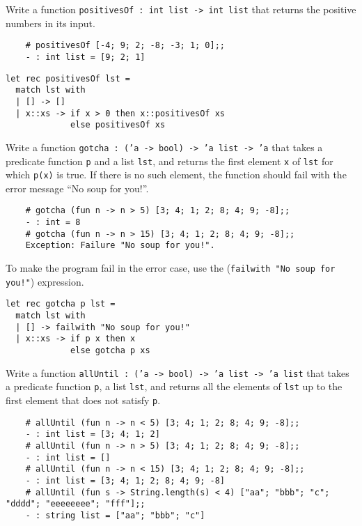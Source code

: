 \documentclass[addpoints]{exam}
\begin{document}
\begin{questions}
  \question 
  Write a function \texttt{positivesOf : int list -> int list}
  that returns the positive numbers in its input.
  \begin{verbatim}
    # positivesOf [-4; 9; 2; -8; -3; 1; 0];;
    - : int list = [9; 2; 1]
  \end{verbatim}
  
  \begin{solutionbox}{3.5cm}
    \begin{verbatim}
let rec positivesOf lst =
  match lst with
  | [] -> []
  | x::xs -> if x > 0 then x::positivesOf xs
             else positivesOf xs
    \end{verbatim}
  \end{solutionbox}

  
  \question 
  Write a function \texttt{gotcha : ('a -> bool) -> 'a list -> 'a} 
  that takes a predicate function \texttt{p} and a list \texttt{lst},
  and returns the first element \texttt{x} of \texttt{lst} for which 
  \texttt{p(x)} is true. If there is no such element,
  the function should fail with the error message 
  ``No soup for you!''.
  \begin{verbatim}
    # gotcha (fun n -> n > 5) [3; 4; 1; 2; 8; 4; 9; -8];;
    - : int = 8
    # gotcha (fun n -> n > 15) [3; 4; 1; 2; 8; 4; 9; -8];;
    Exception: Failure "No soup for you!".
  \end{verbatim}
  To make the program fail in the error case, use the 
  (\texttt{failwith "No soup for you!"}) expression.
  
  \begin{solutionbox}{3.5cm}
    \begin{verbatim}
let rec gotcha p lst =
  match lst with
  | [] -> failwith "No soup for you!"
  | x::xs -> if p x then x
             else gotcha p xs      
    \end{verbatim}
  \end{solutionbox}

  
  \question 
  Write a function \texttt{allUntil : ('a -> bool) -> 'a list -> 'a list} 
  that takes a predicate function \texttt{p}, a list \texttt{lst}, 
  and returns all the elements of \texttt{lst} up to the first element
  that does not satisfy \texttt{p}.
  \begin{verbatim}
    # allUntil (fun n -> n < 5) [3; 4; 1; 2; 8; 4; 9; -8];;
    - : int list = [3; 4; 1; 2]
    # allUntil (fun n -> n > 5) [3; 4; 1; 2; 8; 4; 9; -8];;
    - : int list = []
    # allUntil (fun n -> n < 15) [3; 4; 1; 2; 8; 4; 9; -8];;
    - : int list = [3; 4; 1; 2; 8; 4; 9; -8]
    # allUntil (fun s -> String.length(s) < 4) ["aa"; "bbb"; "c"; "dddd"; "eeeeeeee"; "fff"];;
    - : string list = ["aa"; "bbb"; "c"]
  \end{verbatim}
  

\end{questions}
\end{document}
